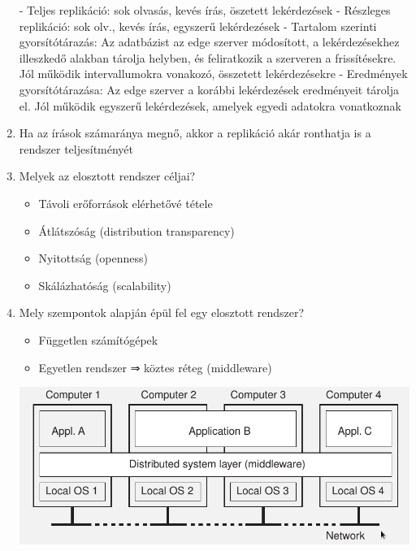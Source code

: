 \documentclass[twoside, a4paper, 12pt]{article}
\begin{document}
\begin{enumerate}
        - Teljes replikáció: sok olvasás, kevés írás, öszetett lekérdezések
        - Részleges replikáció: sok olv., kevés írás, egyszerű lekérdezések
        - Tartalom szerinti gyorsítótárazás: Az adatbázist az edge szerver módosított, a lekérdezésekhez illeszkedő alakban
        tárolja helyben, és feliratkozik a szerveren a frissítésekre. Jól működik intervallumokra vonakozó, összetett lekérdezésekre
        - Eredmények gyorsítótárazása: Az edge szerver a korábbi lekérdezések eredményeit tárolja el. Jól működik egyszerű
        lekérdezések, amelyek egyedi adatokra vonatkoznak
    \item Ha az írások számaránya megnő, akkor a replikáció akár ronthatja is a rendszer teljesítményét 
\color{clrNonExam}
    \item Melyek az elosztott rendszer céljai?
        \begin{itemize}
            \item Távoli erőforrások elérhetővé tétele
            \item Átlátszóság (distribution transparency)
            \item Nyitottság (openness)
            \item Skálázhatóság (scalability)
        \end{itemize}
    \item  Mely szempontok alapján épül fel egy elosztott rendszer?
        \begin{itemize}
            \item Független számítógépek
            \item Egyetlen rendszer ⇒ köztes réteg (middleware)
        \end{itemize}
        \includegraphics[scale=0.5]{images/ElosztottRendszer.png}
\end{enumerate}
\end{document}
